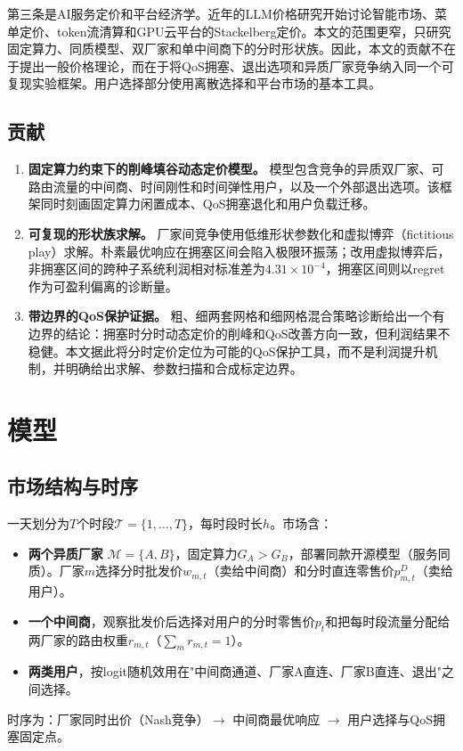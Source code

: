 \documentclass[UTF8,11pt]{ctexart}
\newcommand{\T}{\mathcal{T}}
\newcommand{\M}{\mathcal{M}}
\begin{document}
第三条是AI服务定价和平台经济学。近年的LLM价格研究开始讨论智能市场、菜单定价、token流清算和GPU云平台的Stackelberg定价\cite{demirer2025emerging,erdil2025inference,bergemann2025menu,guo2026prillm,yan2026stackelberg,cunningham2026token,liu2026locational}。本文的范围更窄，只研究固定算力、同质模型、双厂家和单中间商下的分时形状族。因此，本文的贡献不在于提出一般价格理论，而在于将QoS拥塞、退出选项和异质厂家竞争纳入同一个可复现实验框架。用户选择部分使用离散选择和平台市场的基本工具\cite{mcfadden1974conditional,anderson1992discrete,train2009discrete,rochet2003platform}。

\subsection{贡献}

\begin{enumerate}[leftmargin=2em]
  \item \textbf{固定算力约束下的削峰填谷动态定价模型。} 模型包含竞争的异质双厂家、可路由流量的中间商、时间刚性和时间弹性用户，以及一个外部退出选项。该框架同时刻画固定算力闲置成本、QoS拥塞退化和用户负载迁移。
  \item \textbf{可复现的形状族求解。} 厂家间竞争使用低维形状参数化和虚拟博弈（fictitious play）求解。朴素最优响应在拥塞区间会陷入极限环振荡；改用虚拟博弈后，非拥塞区间的跨种子系统利润相对标准差为$4.31\times10^{-4}$，拥塞区间则以regret作为可盈利偏离的诊断量。
  \item \textbf{带边界的QoS保护证据。} 粗、细两套网格和细网格混合策略诊断给出一个有边界的结论：拥塞时分时动态定价的削峰和QoS改善方向一致，但利润结果不稳健。本文据此将分时定价定位为可能的QoS保护工具，而不是利润提升机制，并明确给出求解、参数扫描和合成标定边界。
\end{enumerate}

\section{模型}
\label{sec:model}

\subsection{市场结构与时序}

一天划分为$T$个时段$\T=\{1,\ldots,T\}$，每时段时长$h$。市场含：
\begin{itemize}[leftmargin=2em]
  \item \textbf{两个异质厂家} $\M=\{A,B\}$，固定算力$G_A>G_B$，部署同款开源模型（服务同质）。厂家$m$选择分时批发价$w_{m,t}$（卖给中间商）和分时直连零售价$p^D_{m,t}$（卖给用户）。
  \item \textbf{一个中间商}，观察批发价后选择对用户的分时零售价$p_t$和把每时段流量分配给两厂家的路由权重$r_{m,t}$（$\sum_m r_{m,t}=1$）。
  \item \textbf{两类用户}，按logit随机效用在"中间商通道、厂家A直连、厂家B直连、退出"之间选择。
\end{itemize}
时序为：厂家同时出价（Nash竞争）$\to$ 中间商最优响应 $\to$ 用户选择与QoS拥塞固定点。
\end{document}

